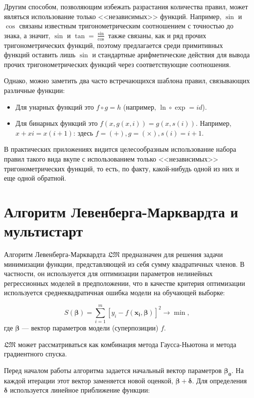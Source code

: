 \documentclass[12pt,a4paper]{amsart}
\begin{document}
Другим способом, позволяющим избежать разрастания количества правил, может
являться использование только <<независимых>> функций. Например, $\sin$ и
$\cos$ связаны известным тригонометрическим соотношением с точностью до знака,
а значит, $\sin$ и $\tan = \frac{\sin}{\cos}$ также связаны, как и ряд прочих
тригонометрических функций, поэтому предлагается среди примитивных функций
оставить лишь $\sin$ и стандартные арифметические действия для вывода прочих
тригонометрических функций через соответствующие соотношения.

Однако, можно заметить два часто встречающихся шаблона правил, связывающих
различные функции:
\begin{itemize}
  \item Для унарных функций это $f \circ g = h$ (например,
	$\ln \circ \exp = id$).
  \item Для бинарных функций это $ f (x, g (x, i)) = g (x, s (i)) $.
	Например, $x + xi = x(i+1)$: здесь $f = (+), g = (\times), s(i) = i + 1$.
\end{itemize}

В практических приложениях видится целесообразным использование набора правил
такого вида вкупе с использованием только <<независимых>> тригонометрических
функций, то есть, по факту, какой-нибудь одной из них и еще одной обратной.

\section{Алгоритм Левенберга-Марквардта и мультистарт}

Алгоритм Левенберга-Марквардта $\mathfrak{LM}$ предназначен для решения
задачи минимизации функции, представляющей из себя сумму квадратичных членов.
В частности, он используется для оптимизации параметров нелинейных регрессионных
моделей в предположении, что в качестве критерия оптимизации используется
среднеквадратичная ошибка модели на обучающей выборке:

\[
S(\mathbf{\beta}) = \sum_{i=1}^{m} [y_i - f(\mathbf{x_i}, \mathbf{\beta})]^2 \to \min,
\]
где $\mathbf{\beta}$ --- вектор параметров модели (суперпозиции) $f$.

$\mathfrak{LM}$ может рассматриваться как комбинация метода Гаусса-Ньютона и
метода градиентного спуска.

Перед началом работы алгоритма задается начальный вектор параметров $\mathbf{\beta_0}$.
На каждой итерации этот вектор заменяется новой оценкой, $\mathbf{\beta + \delta}$.
Для определения $\mathbf{\delta}$ используется линейное приближение функции:
\end{document}
